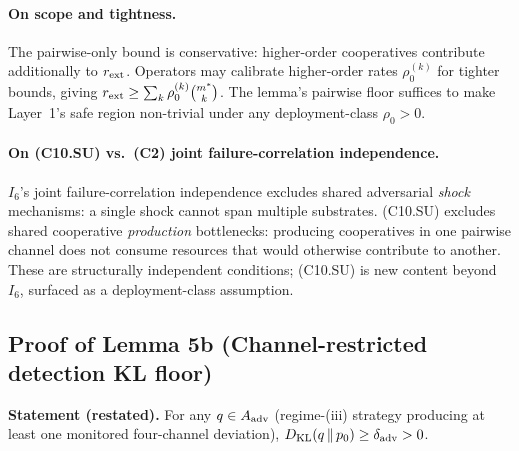 \paragraph{On scope and tightness.}
The pairwise-only bound is conservative: higher-order cooperatives
contribute additionally to $r_{\mathrm{ext}}$.  Operators may calibrate
higher-order rates $\rho_0^{(k)}$ for tighter bounds, giving
$r_{\mathrm{ext}} \geq \sum_k \rho_0^{(k)} \binom{m^*}{k}$.  The lemma's
pairwise floor suffices to make Layer~1's safe region non-trivial
under any deployment-class $\rho_0 > 0$.

\paragraph{On (C10.SU) vs.\ (C2) joint failure-correlation independence.}
$I_6$'s joint failure-correlation independence excludes shared
adversarial \emph{shock} mechanisms: a single shock cannot span
multiple substrates.  (C10.SU) excludes shared cooperative
\emph{production} bottlenecks: producing cooperatives in one
pairwise channel does not consume resources that would otherwise
contribute to another.  These are structurally independent
conditions; (C10.SU) is new content beyond $I_6$, surfaced as a
deployment-class assumption.

\subsection{Proof of Lemma 5b (Channel-restricted detection KL floor)}
\label{app:proof_lem5b}

\textbf{Statement (restated).}  For any $q \in A_{\mathrm{adv}}$ (regime-(iii)
strategy producing at least one monitored four-channel deviation),
$D_{\mathrm{KL}}(q \,\|\, p_0) \geq \delta_{\mathrm{adv}} > 0$.


